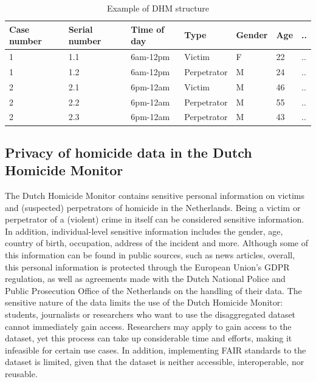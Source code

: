 \vspace{10pt}
\begin{table}[H]
\small
\centering
\begin{tabular}{@{}lllllll@{}}
\toprule
Case number & Serial number & Time of day & Type        & Gender & Age & .. \\ \midrule
1           & 1.1           & 6am-12pm    & Victim      & F      & 22  & .. \\
1           & 1.2           & 6am-12pm    & Perpetrator & M      & 24  & .. \\
2           & 2.1           & 6pm-12am    & Victim      & M      & 46  & .. \\
2           & 2.2           & 6pm-12am    & Perpetrator & M      & 55  & .. \\
2           & 2.3           & 6pm-12am    & Perpetrator & M      & 43  & .. \\ \bottomrule
\end{tabular}
\caption{Example of DHM structure}
\label{tab:my-table}
\end{table}
\vspace{10pt}

\subsection{Privacy of homicide data in the Dutch Homicide Monitor}
The Dutch Homicide Monitor contains sensitive personal information on victims and (suspected) perpetrators of homicide in the Netherlands. Being a victim or perpetrator of a (violent) crime in itself can be considered sensitive information. In addition, individual-level sensitive information includes the gender, age, country of birth, occupation, address of the incident and more. Although some of this information can be found in public sources, such as news articles, overall, this personal information is protected through the European Union's GDPR regulation, as well as agreements made with the Dutch National Police and Public Prosecution Office of the Netherlands on the handling of their data. The sensitive nature of the data limits the use of the Dutch Homicide Monitor: students, journalists or researchers who want to use the disaggregated dataset cannot immediately gain access. Researchers may apply to gain access to the dataset, yet this process can take up considerable time and efforts, making it infeasible for certain use cases. In addition, implementing FAIR standards to the dataset is limited, given that the dataset is neither accessible, interoperable, nor reusable. 

